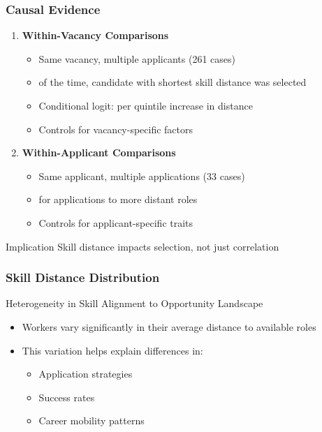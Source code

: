 \documentclass[11pt,xcolor={dvipsnames},hyperref={pdftex,pdfpagemode=UseNone,hidelinks,pdfdisplaydoctitle=true},usepdftitle=false]{beamer}
\begin{document}
\begin{frame}
\frametitle{Causal Evidence}
\begin{enumerate}
\item \textbf{Within-Vacancy Comparisons}
\begin{itemize}
\item Same vacancy, multiple applicants (261 cases)
\item {} of the time, candidate with shortest skill distance was selected
\item Conditional logit:  per quintile increase in distance
\item Controls for vacancy-specific factors
\end{itemize}

\item \textbf{Within-Applicant Comparisons}
\begin{itemize}
\item Same applicant, multiple applications (33 cases)
\item {} for applications to more distant roles
\item Controls for applicant-specific traits
\end{itemize}
\end{enumerate}

\begin{block}{Implication}
Skill distance  impacts selection, not just correlation
\end{block}
\end{frame}

\begin{frame}
\frametitle{Skill Distance Distribution}
\begin{center}
\end{center}

\begin{block}{Heterogeneity in Skill Alignment to Opportunity Landscape}
\begin{itemize}
\item Workers vary significantly in their average distance to available roles
\item This variation helps explain differences in:
\begin{itemize}
\item Application strategies
\item Success rates
\item Career mobility patterns
\end{itemize}
\end{itemize}
\end{block}
\end{frame}
\end{document}
